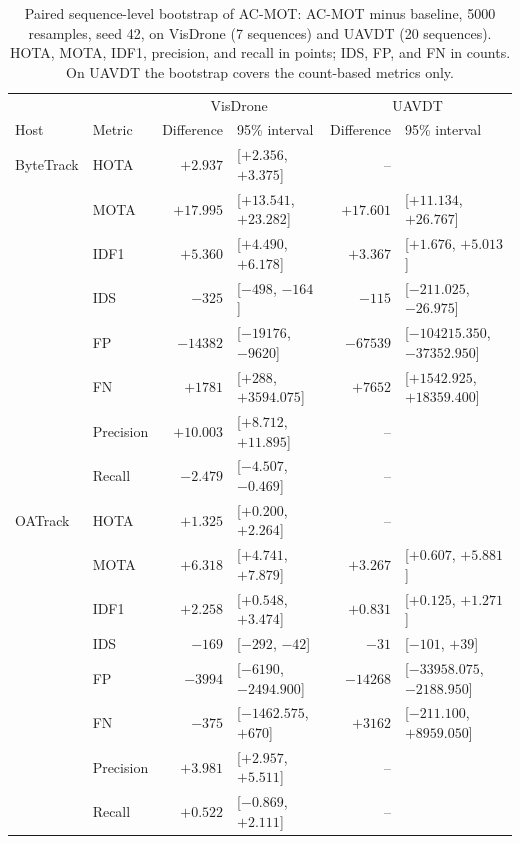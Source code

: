 \begin{table}[tbp]
\centering
\caption{Paired sequence-level bootstrap of AC-MOT: AC-MOT minus baseline, 5000 resamples, seed 42, on VisDrone (7 sequences) and UAVDT (20 sequences). HOTA, MOTA, IDF1, precision, and recall in points; IDS, FP, and FN in counts. On UAVDT the bootstrap covers the count-based metrics only.}
\label{tab:ac-bootstrap}
\footnotesize\setlength{\tabcolsep}{4pt}
\begin{tabular}{llrlrl}
\toprule
 & & \multicolumn{2}{c}{VisDrone} & \multicolumn{2}{c}{UAVDT}\\
Host & Metric & Difference & 95\% interval & Difference & 95\% interval\\
\midrule
ByteTrack & HOTA & $+2.937$ & [$+2.356$, $+3.375$] & -- & \\
 & MOTA & $+17.995$ & [$+13.541$, $+23.282$] & $+17.601$ & [$+11.134$, $+26.767$]\\
 & IDF1 & $+5.360$ & [$+4.490$, $+6.178$] & $+3.367$ & [$+1.676$, $+5.013$]\\
 & IDS & $-325$ & [$-498$, $-164$] & $-115$ & [$-211.025$, $-26.975$]\\
 & FP & $-14382$ & [$-19176$, $-9620$] & $-67539$ & [$-104215.350$, $-37352.950$]\\
 & FN & $+1781$ & [$+288$, $+3594.075$] & $+7652$ & [$+1542.925$, $+18359.400$]\\
 & Precision & $+10.003$ & [$+8.712$, $+11.895$] & -- & \\
 & Recall & $-2.479$ & [$-4.507$, $-0.469$] & -- & \\
\midrule
OATrack & HOTA & $+1.325$ & [$+0.200$, $+2.264$] & -- & \\
 & MOTA & $+6.318$ & [$+4.741$, $+7.879$] & $+3.267$ & [$+0.607$, $+5.881$]\\
 & IDF1 & $+2.258$ & [$+0.548$, $+3.474$] & $+0.831$ & [$+0.125$, $+1.271$]\\
 & IDS & $-169$ & [$-292$, $-42$] & $-31$ & [$-101$, $+39$]\\
 & FP & $-3994$ & [$-6190$, $-2494.900$] & $-14268$ & [$-33958.075$, $-2188.950$]\\
 & FN & $-375$ & [$-1462.575$, $+670$] & $+3162$ & [$-211.100$, $+8959.050$]\\
 & Precision & $+3.981$ & [$+2.957$, $+5.511$] & -- & \\
 & Recall & $+0.522$ & [$-0.869$, $+2.111$] & -- & \\
\bottomrule
\end{tabular}
\end{table}

